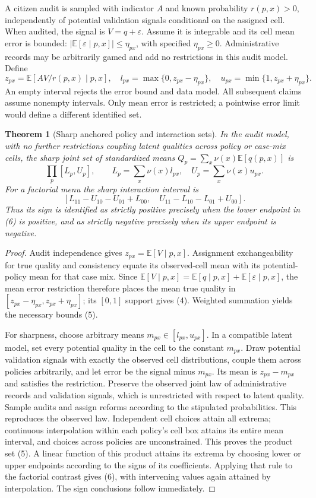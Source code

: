 \documentclass[11pt]{article}
\newtheorem{theorem}{Theorem}
\newcommand{\E}{\mathbb E}
\begin{document}
A citizen audit is sampled with indicator $A$ and known probability
$r(p,x)>0$, independently of potential validation signals conditional on
the assigned cell. When audited, the signal is $V=q+\varepsilon$.
Assume it is integrable and its cell mean error is bounded:
$|\E[\varepsilon\mid p,x]|\leq\eta_{px}$, with specified
$\eta_{px}\geq0$. Administrative records may be arbitrarily gamed and add
no restrictions in this audit model. Define
\[
 z_{px}=\E[AV/r(p,x)\mid p,x],\quad
 l_{px}=\max\{0,z_{px}-\eta_{px}\},\quad
 u_{px}=\min\{1,z_{px}+\eta_{px}\}.                            \tag{4}
\]
An empty interval rejects the error bound and data model. All subsequent
claims assume nonempty intervals. Only mean error is restricted; a
pointwise error limit would define a different identified set.

\begin{theorem}[Sharp anchored policy and interaction sets]\label{audit}
In the audit model, with no further restrictions coupling latent qualities
across policy or case-mix cells, the sharp joint set of standardized means
$Q_p=\sum_x\nu(x)\E[q(p,x)]$ is
\[
 \prod_p[L_p,U_p],\qquad
 L_p=\sum_x\nu(x)l_{px},\quad U_p=\sum_x\nu(x)u_{px}.           \tag{5}
\]
For a factorial menu the sharp interaction interval is
\[
 [L_{11}-U_{10}-U_{01}+L_{00},\quad
  U_{11}-L_{10}-L_{01}+U_{00}].                               \tag{6}
\]
Thus its sign is identified as strictly positive precisely when the lower
endpoint in (6) is positive, and as strictly negative precisely when its
upper endpoint is negative.
\end{theorem}
\begin{proof}
Audit independence gives $z_{px}=\E[V\mid p,x]$.
Assignment exchangeability for true quality and consistency equate its
observed-cell mean with its potential-policy mean for that case mix. Since
$\E[V\mid p,x]=\E[q\mid p,x]+\E[\varepsilon\mid p,x]$, the mean
error restriction therefore places the mean true quality in
$[z_{px}-\eta_{px},z_{px}+\eta_{px}]$; its $[0,1]$ support gives (4).
Weighted summation yields the necessary bounds (5).

For sharpness, choose arbitrary means $m_{px}\in[l_{px},u_{px}]$.
In a compatible latent model, set every potential quality in the cell to
the constant $m_{px}$. Draw potential validation signals with exactly the
observed cell distributions, couple them across policies arbitrarily,
and let error be the signal minus $m_{px}$. Its mean is
$z_{px}-m_{px}$ and satisfies the restriction. Preserve the observed joint
law of administrative records and validation signals, which is unrestricted
with respect to latent quality. Sample audits and assign reforms according
to the stipulated probabilities. This reproduces the observed law.
Independent cell choices attain all extrema; continuous interpolation
within each policy's cell box attains its entire mean interval, and choices
across policies are unconstrained. This proves the product set (5).
A linear function of this product attains its extrema by choosing lower
or upper endpoints according to the signs of its coefficients. Applying
that rule to the factorial contrast gives (6), with intervening values
again attained by interpolation. The sign conclusions follow immediately.
\end{proof}
\end{document}
